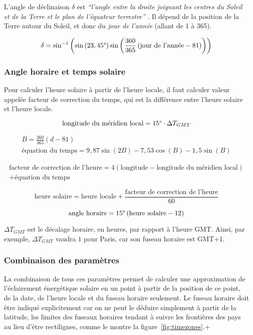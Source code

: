 \documentclass[12pt]{article}
\begin{document}
L'angle de déclinaison $\delta$ est \emph{``l'angle entre la droite joignant les centres du Soleil et de la Terre et le plan de l'équateur terrestre''} \cite{mouvement_terre}. Il dépend de la position de la Terre autour du Soleil, et donc du \emph{jour de l'année} (allant de 1 à 365).

\[
	\delta = \sin^{-1} \left(
		\sin \left( 23,45\degree \right)
		\sin \left(
			\frac{360}{365}
			\left(
				\text{jour de l'année} - 81
			\right)
		\right)
	\right)
\]



\subsubsection{Angle horaire et temps solaire} %


Pour calculer l'heure solaire à partir de l'heure locale, il faut calculer valeur appelée facteur de correction du temps, qui est la différence entre l'heure solaire et l'heure locale.


\[
	\text{longitude du méridien local} = 15 \degree \cdot \Delta T_{GMT}
\]

\begin{gather*}
	B = \frac{360}{365} \left( d - 81 \right) \\
	\text{équation du temps} = 9,87 \sin \left( 2B \right) - 7,53 \cos \left( B \right) - 1,5 \sin \left( B \right)
\end{gather*}

\begin{multline*}
	\text{facteur de correction de l'heure} = 4 \left( \text{longitude} - \text{longitude du méridien local} \right) \\ + \text{équation du temps}
\end{multline*}

\[
	\text{heure solaire} = \text{heure locale} + \frac{\text{facteur de correction de l'heure}}{60}
\]

\[
	\text{angle horaire} = 15 \degree \left(
		\text{heure solaire} - 12
	\right)
\]

$\Delta T_{GMT}$ est le décalage horaire, en heures, par rapport à l'heure GMT. Ainsi, par exemple, $\Delta T_{GMT}$ vaudra $1$ pour Paris, car son fuseau horaire est GMT+1.

\subsubsection{Combinaison des paramètres}
La combinaison de tous ces paramètres permet de calculer une approximation de l'éclairement énergétique solaire en un point à partir de la position de ce point, de la date, de l'heure locale et du fuseau horaire seulement.
Le fuseau horaire doit être indiqué explicitement car on ne peut le déduire simplement à partir de la latitude, les limites des fuseaux horaires tendant à suivre les frontières des pays au lieu d'être rectilignes, comme le montre la figure~\ref{fig:timezones}.+
\end{document}
